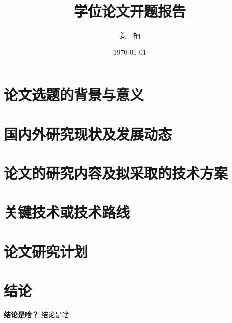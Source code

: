\documentclass[12pt,a4paper]{article}
\title{学位论文开题报告}
\author{姜~~楠}
\date{\today}
\begin{document}
\maketitle

\tableofcontents
\newpage


\section{论文选题的背景与意义}
\section{国内外研究现状及发展动态}
\section{论文的研究内容及拟采取的技术方案}
\section{关键技术或技术路线}
\section{论文研究计划}

\newpage
\section{结论}
\textbf{结论是啥？} 结论是啥

\newpage
{}

\end{document}
